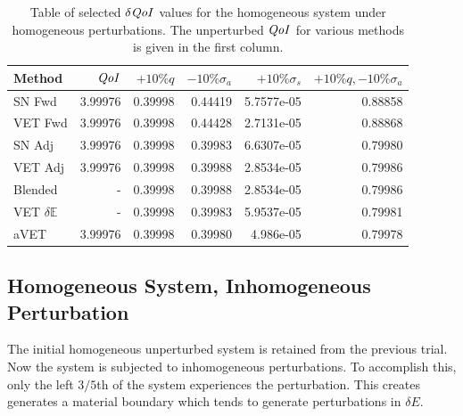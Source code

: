 \documentclass[12pt]{report}
\newcommand{\Edd}{\mathbb{E}}
\newcommand{\sigs}{\sigma_s}
\newcommand{\siga}{\sigma_a}
\newcommand{\qoi}{{\it QoI}\xspace}
\begin{document}
\begin{table}[H]
\label{TableT1}
\centering
  \begin{tabular}{| l | r || r | r | r | r |}
    \hline
    Method  & $\qoi$ & $+10\% q $  & $-10\% \siga $ & $+10\% \sigs $ & $+10\% q,-10\% \siga$ \\ \hline
     SN Fwd 			&3.99976	&0.39998 &0.44419 &5.7577e-05 & 0.88858\\ \hline
     VET Fwd			&3.99976	&0.39998 &0.44428 &2.7131e-05 &0.88868\\ \hline
     SN Adj			    &3.99976	&0.39998 &0.39983 &6.6307e-05 &0.79980\\ \hline
     VET Adj 			&3.99976	&0.39998 &0.39988 &2.8534e-05 &0.79986\\ \hline
     Blended 			&-			&0.39998 &0.39988 &2.8534e-05 &0.79986\\ \hline
     VET $\delta \Edd$ 	&-			&0.39998 &0.39983 &5.9537e-05 &0.79981\\ \hline
     aVET				&3.99976 	&0.39998 &0.39980  &4.986e-05	 &0.79978\\ \hline
    \end{tabular}
  \caption{Table of selected $\delta \qoi$ values for the homogeneous system under homogeneous perturbations. The unperturbed $\qoi$ for various methods is given in the first column.}
\end{table}


\subsection{Homogeneous System, Inhomogeneous Perturbation}
The initial homogeneous unperturbed system is retained from the previous trial. Now the system is subjected to inhomogeneous perturbations. To accomplish this, only the left $3/5$th of the system experiences the perturbation. This creates generates a material boundary which tends to generate perturbations in $\delta E$.
\end{document}
